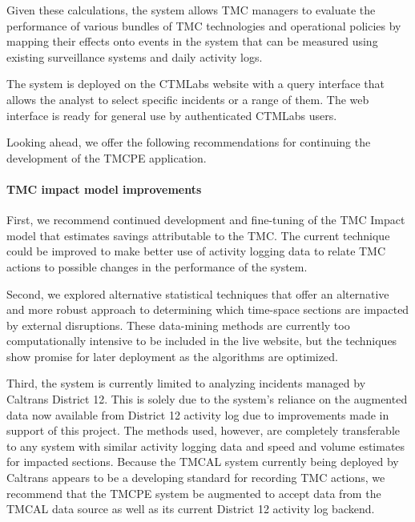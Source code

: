 \documentclass[12pt]{report}
\newcounter{time}
\newcounter{space}
\begin{document}
Given these calculations, the system allows \ac{TMC} managers to evaluate the
performance of various bundles of \ac{TMC} technologies and operational policies
by mapping their effects onto events in the system that can be measured using
existing surveillance systems and daily activity logs.  

The system is deployed on the \ac{CTMLabs} website with a query interface that
allows the analyst to select specific incidents or a range of them.  The web
interface is ready for general use by authenticated \ac{CTMLabs} users.

Looking ahead, we offer the following recommendations for continuing the
development of the \ac{TMCPE} application.  

\paragraph{TMC impact model improvements}

First, we recommend continued development and fine-tuning of the TMC Impact
model that estimates savings attributable to the \ac{TMC}.  The current
technique could be improved to make better use of activity logging data to
relate \ac{TMC} actions to possible changes in the performance of the system.  

Second, we explored alternative statistical techniques that
offer an alternative and more robust approach to determining which time-space
sections are impacted by external disruptions.  These data-mining methods
are currently too computationally intensive to be included in the live website,
but the techniques show promise for later deployment as the algorithms are
optimized.

Third, the system is currently limited to analyzing incidents managed by
Caltrans District 12.  This is solely due to the system's reliance on the augmented
data now available from District 12 activity log due to improvements made in
support of this project.  The methods used, however, are completely transferable
to any system with similar activity logging data and speed and volume estimates
for impacted sections.  Because the \ac{TMCAL} system currently being deployed
by Caltrans appears to be a developing standard for recording \ac{TMC} actions,
we recommend that the \ac{TMCPE} system be augmented to accept data from the
\ac{TMCAL} data source as well as its current District 12 activity log backend.
\end{document}
